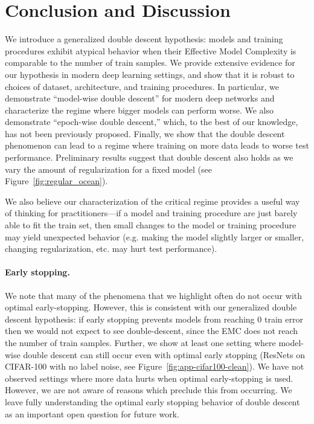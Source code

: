 \section{Conclusion and Discussion}
\label{sec:discuss}
We introduce a generalized double descent hypothesis: models and training procedures exhibit atypical behavior
when their Effective Model Complexity
is comparable to the number of train samples.
We provide extensive evidence for our hypothesis
in modern deep learning settings,
and show that it is robust to choices of dataset,
architecture, and training procedures.
In particular, we demonstrate ``model-wise double descent''
for modern deep networks and
characterize the regime where bigger models can perform worse.
We also demonstrate ``epoch-wise double descent,''
which, to the best of our knowledge, has not been previously proposed.
Finally, we show that the double descent phenomenon can
lead to a regime where training on more data leads to worse test performance.
Preliminary results suggest that double descent also holds
as we vary the amount of regularization for a fixed model
(see Figure~\ref{fig:regular_ocean}).

We also believe our characterization of the critical regime provides a useful
way of thinking for practitioners---if a model and training procedure are
just barely able to fit the train set, then small changes
to the model or training procedure may yield unexpected behavior
(e.g. making the model slightly larger or smaller, changing regularization, etc. may hurt test performance).

\paragraph{Early stopping.} 
We note that many of the phenomena that we highlight
often do not occur with optimal early-stopping.
However, this is consistent with our
generalized double descent hypothesis: 
if early stopping prevents models from reaching $0$ train error
then we would not expect to see double-descent, since 
the EMC does not reach the number of train samples.
Further, we show at least one setting where model-wise double descent can still occur
even with optimal early stopping
(ResNets on CIFAR-100 with no label noise, see Figure~\ref{fig:app-cifar100-clean}).
We have not observed settings where more data hurts
when optimal early-stopping is used.
However, we are not aware of reasons which preclude this from occurring.
We leave fully understanding the optimal early stopping behavior of double descent
as an important open question for future work.



